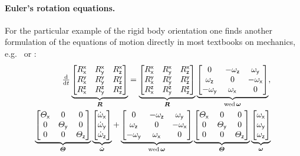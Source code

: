 \paragraph{Euler's rotation equations.}
For the particular example of the rigid body orientation one finds another formulation of the equations of motion directly in most textbooks on mechanics, e.g.\ \cite[p.\,143]{Arnold:MathematicalMethodsOfClassicalMechanics} or \cite[p.\,145]{Schwertassek:MultibodySystems}:
\begin{subequations}\label{eq:ExampleEulerEq}
\begin{align}
 \ddt
 \underbrace{\begin{bmatrix} \Rxx & \Rxy & \Rxz \\ \Ryx & \Ryy & \Ryz \\ \Rzx & \Rzy & \Rzz \end{bmatrix}}_{\R}
 =
 \underbrace{\begin{bmatrix} \Rxx & \Rxy & \Rxz \\ \Ryx & \Ryy & \Ryz \\ \Rzx & \Rzy & \Rzz \end{bmatrix}}_{\R}
 \underbrace{\begin{bmatrix} 0 & -\wz & \wy \\ \wz & 0 & -\wx \\ -\wy & \wx & 0\end{bmatrix}}_{\wedOp{\w}},
\label{eq:ExampleEulerEqKinematics}
\\
 \underbrace{\begin{bmatrix} \Jx & 0 & 0 \\ 0 & \Jy & 0 \\ 0 & 0 & \Jz \end{bmatrix}}_{\J}
 \underbrace{\begin{bmatrix} \wxd \\ \wyd \\ \wzd \end{bmatrix}}_{\dot{\w}}
 + \underbrace{\begin{bmatrix} 0 & -\wz & \wy \\ \wz & 0 & -\wx \\ -\wy & \wx & 0\end{bmatrix}}_{\wedOp{\w}}
 \underbrace{\begin{bmatrix} \Jx & 0 & 0 \\ 0 & \Jy & 0 \\ 0 & 0 & \Jz \end{bmatrix}}_{\J}
 \underbrace{\begin{bmatrix} \wx \\ \wy \\ \wz \end{bmatrix}}_{\w}

\end{align}
\end{subequations}
